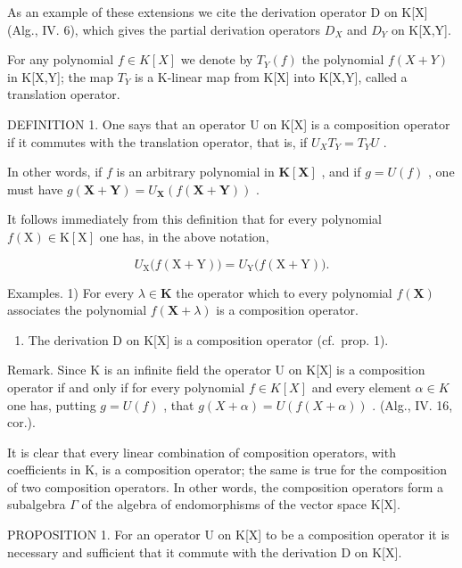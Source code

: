 As an example of these extensions we cite the derivation operator D on K{[}X{]} (Alg., IV. 6), which gives the partial derivation operators \(D_{X}\) and \(D_{Y}\) on K{[}X,Y{]}.

For any polynomial \(f \in K[X]\) we denote by \(T_{Y}(f)\) the polynomial \(f(X + Y)\) in K{[}X,Y{]}; the map \(T_{Y}\) is a K-linear map from K{[}X{]} into K{[}X,Y{]}, called a translation operator.

DEFINITION 1. One says that an operator U on K{[}X{]} is a composition operator if it commutes with the translation operator, that is, if \(U_{X}T_{Y} = T_{Y}U\) .

In other words, if \(f\) is an arbitrary polynomial in \(\mathbf{K}[\mathbf{X}]\) , and if \(g = U(f)\) , one must have \(g(\mathbf{X} + \mathbf{Y}) = U_{\mathbf{X}}(f(\mathbf{X} + \mathbf{Y}))\) .

It follows immediately from this definition that for every polynomial \(f(\mathrm{X}) \in \mathrm{K}[\mathrm{X}]\) one has, in the above notation,

\[
U _ {\mathrm{X}} \big (f (\mathrm{X} + \mathrm{Y}) \big) = U _ {\mathrm{Y}} \big (f (\mathrm{X} + \mathrm{Y}) \big).\tag{1}
\]

Examples. 1) For every \(\lambda \in \mathbf{K}\) the operator which to every polynomial \(f(\mathbf{X})\) associates the polynomial \(f(\mathbf{X} + \lambda)\) is a composition operator.

\begin{enumerate}
\def\labelenumi{\arabic{enumi})}
\setcounter{enumi}{1}
\tightlist
\item
  The derivation D on K{[}X{]} is a composition operator (cf.~prop. 1).
\end{enumerate}

Remark. Since K is an infinite field the operator U on K{[}X{]} is a composition operator if and only if for every polynomial \(f \in K[X]\) and every element \(\alpha \in K\) one has, putting \(g = U(f)\) , that \(g(X + \alpha) = U(f(X + \alpha))\) . (Alg., IV. 16, cor.).

It is clear that every linear combination of composition operators, with coefficients in K, is a composition operator; the same is true for the composition of two composition operators. In other words, the composition operators form a subalgebra \(\Gamma\) of the algebra of endomorphisms of the vector space K{[}X{]}.

PROPOSITION 1. For an operator U on K{[}X{]} to be a composition operator it is necessary and sufficient that it commute with the derivation D on K{[}X{]}.

